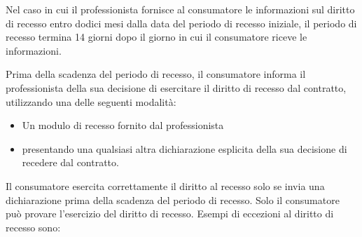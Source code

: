 Nel caso in cui il professionista fornisce al consumatore le informazioni sul diritto di recesso entro dodici mesi dalla data del periodo di recesso iniziale, il periodo di recesso termina 14 giorni dopo il giorno in cui il consumatore riceve le informazioni.


Prima della scadenza del periodo di recesso, il consumatore informa il professionista della sua decisione di esercitare il diritto di recesso dal contratto, utilizzando una delle seguenti modalità:
\begin{itemize}
    \item Un modulo di recesso fornito dal professionista
    \item presentando una qualsiasi altra dichiarazione esplicita della sua decisione di recedere dal contratto.
\end{itemize}
Il consumatore esercita correttamente il diritto al recesso solo se invia una dichiarazione prima della scadenza del periodo di recesso.
Solo il consumatore può provare l'esercizio del diritto di recesso.
\newline
Esempi di eccezioni al diritto di recesso sono:
